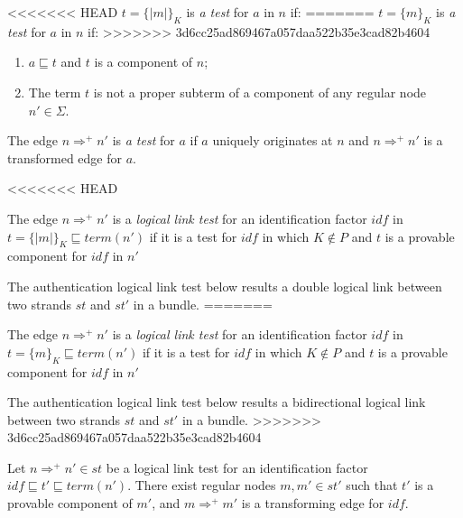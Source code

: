 \begin{flushleft}
\begin{flushleft}
\begin{Definition}
\begin{itemize}
\begin{Definition}
\begin{Definition}[A Test] 
<<<<<<< HEAD
$t = \{|m|\}_K$ is \emph{a test} for $a$ in $n$ if:
=======
$t = \{m\}_K$ is \emph{a test} for $a$ in $n$ if:
>>>>>>> 3d6cc25ad869467a057daa522b35e3cad82b4604
\begin{enumerate}
\item $a\sqsubseteq t$ and $t$ is a component of $n$;
\item The term $t$ is not a proper subterm of a component of any regular node $n' \in \Sigma$. 
\end{enumerate}
The edge $n \Rightarrow^+ n'$ is \emph{a test} for $a$ if $a$ uniquely originates at $n$ and $n \Rightarrow^+ n'$ is a transformed edge for $a$. 
\end{Definition}

<<<<<<< HEAD
\begin{Definition} The edge $n \Rightarrow^+ n'$ is a \emph{logical link test} for an identification factor $idf$ in $t = \{|m|\}_K \sqsubseteq term(n')$ if it is a test for $idf$ in which $K \not\in P$ and $t$ is a provable component for $idf$ in $n'$
\end{Definition}

The authentication logical link test below results a double logical link between two strands $st$ and $st'$ in a bundle. 
=======
\begin{Definition} The edge $n \Rightarrow^+ n'$ is a \emph{logical link test} for an identification factor $idf$ in $t = \{m\}_K \sqsubseteq term(n')$ if it is a test for $idf$ in which $K \not\in P$ and $t$ is a provable component for $idf$ in $n'$
\end{Definition}

The authentication logical link test below results a bidirectional logical link between two strands $st$ and $st'$ in a bundle. 
>>>>>>> 3d6cc25ad869467a057daa522b35e3cad82b4604
\begin{Proposition}\label{logicaltest}Let $n \Rightarrow^+ n' \in st$ be a logical link test for an identification factor $idf \sqsubseteq t' \sqsubseteq term(n')$. There exist regular nodes $m, m' \in st'$ such that $t'$ is a provable component of $m'$, and $m \Rightarrow^+ m'$ is a transforming edge for $idf$. 
\end{Proposition}


\end{Definition}
\end{itemize}
\end{Definition}
\end{flushleft}
\end{flushleft}

